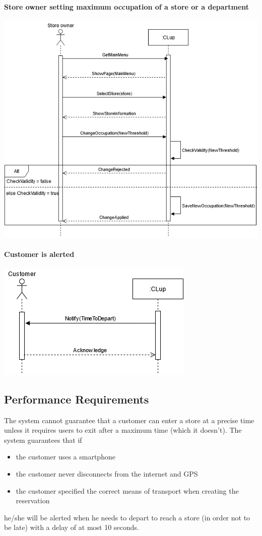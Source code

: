\paragraph{Store owner setting maximum occupation of a store or a department}
\begin{flushleft}
	\includegraphics[scale=0.5]{Images/UseCase9Diagram.png}
\end{flushleft}
\newpage
\paragraph{Customer is alerted}
\begin{flushleft}
	\includegraphics[scale=0.5]{Images/UseCase10Diagram.png}
\end{flushleft}

\subsection{Performance Requirements}
The system cannot guarantee that a customer can enter a store at a precise time unless it requires users to exit after a maximum time (which it doesn't).
The system guarantees that if
\begin{itemize}
	\item the customer uses a smartphone
	\item the customer never disconnects from the internet and GPS
	\item the customer specified the correct means of transport when creating the reservation
\end{itemize}
 he/she will be alerted when he needs to depart to reach a store (in order not to be late) with a delay of at most 10 seconds.
